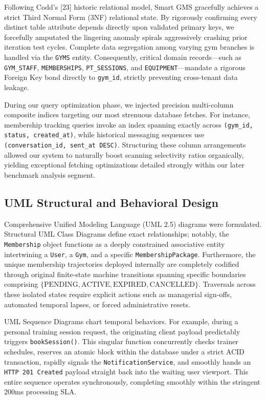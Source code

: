 Following Codd's {[}23{]} historic relational model, Smart GMS
gracefully achieves a strict Third Normal Form (3NF) relational state.
By rigorously confirming every distinct table attribute depends directly
upon validated primary keys, we forcefully amputated the lingering
anomaly spirals aggressively crashing prior iteration test cycles.
Complete data segregation among varying gym branches is handled via the
\texttt{GYMS} entity. Consequently, critical domain records---such as
\texttt{GYM\_STAFF}, \texttt{MEMBERSHIPS}, \texttt{PT\_SESSIONS}, and
\texttt{EQUIPMENT}---mandate a rigorous Foreign Key bond directly to
\texttt{gym\_id}, strictly preventing cross-tenant data leakage.

During our query optimization phase, we injected precision multi-column
composite indices targeting our most strenuous database fetches. For
instance, membership tracking queries invoke an index spanning exactly
across \texttt{(gym\_id, status, created\_at)}, while historical
messaging sequences use \texttt{(conversation\_id, sent\_at DESC)}.
Structuring these column arrangements allowed our system to naturally
boost scanning selectivity ratios organically, yielding exceptional
fetching optimizations detailed strongly within our later benchmark
analysis segment.

\subsection{UML Structural and Behavioral
Design}\label{uml-structural-and-behavioral-design}

Comprehensive Unified Modeling Language (UML 2.5) diagrams were
formulated. Structural UML Class Diagrams define exact relationships;
notably, the \texttt{Membership} object functions as a deeply
constrained associative entity intertwining a \texttt{User}, a
\texttt{Gym}, and a specific \texttt{MembershipPackage}. Furthermore,
the unique membership trajectories deployed internally are completely
codified through original finite-state machine transitions spanning
specific boundaries comprising
\(\{\text{PENDING}, \text{ACTIVE}, \text{EXPIRED}, \text{CANCELLED}\}\).
Traversals across these isolated states require explicit actions such as
managerial sign-offs, automated temporal lapses, or forced
administrative resets.

UML Sequence Diagrams chart temporal behaviors. For example, during a
personal training session request, the originating client payload
predictably triggers \texttt{bookSession()}. This singular function
concurrently checks trainer schedules, reserves an atomic block within
the database under a strict ACID transaction, rapidly signals the
\texttt{NotificationService}, and smoothly hands an
\texttt{HTTP 201 Created} payload straight back into the waiting user
viewport. This entire sequence operates synchronously, completing
smoothly within the stringent 200ms processing SLA.

